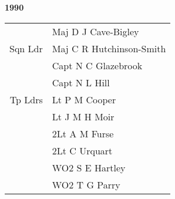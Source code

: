 \begin{center}
  \Huge
  \textbf{1990}
\end{center}

\begin{center}
  \small
  \begin{tabular}{rl}
     & Maj D J Cave-Bigley \\
    Sqn Ldr & Maj C R Hutchinson-Smith \\
     & Capt N C Glazebrook \\
     & Capt N L Hill \\
    Tp Ldrs & Lt P M Cooper \\
     & Lt J M H Moir \\
     & 2Lt A M Furse \\
     & 2Lt C Urquart \\
     & WO2 S E Hartley \\
     & WO2 T G Parry \\
  \end{tabular}
\end{center}

